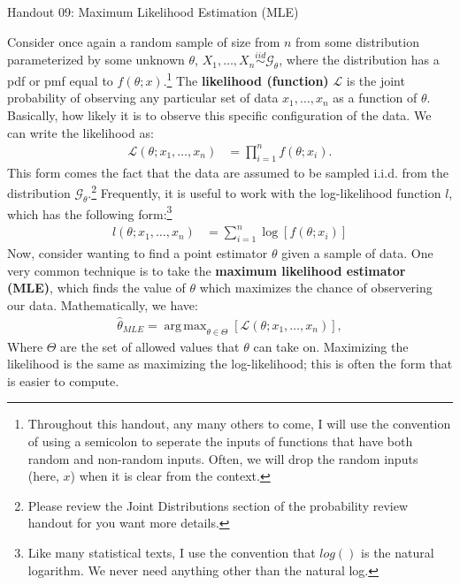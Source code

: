 \documentclass{tufte-handout}
\DeclareMathOperator*{\argmax}{arg\,max}
\newcommand{\iid}{\stackrel{iid}{\sim}}
\begin{document}
\justify

{\LARGE Handout 09: Maximum Likelihood Estimation (MLE)}

\vspace*{18pt}

\noindent
Consider once again a random sample of size from $n$ from some
distribution parameterized by some unknown $\theta$,
$X_1, \ldots, X_n \iid \mathcal{G}_\theta$, where the distribution has a
pdf or pmf equal to $f(\theta; x)$.\footnote{
  Throughout this handout, any many others to come, I will use 
  the convention of using a semicolon to seperate the inputs of
  functions that have both random and non-random inputs. Often,
  we will drop the random inputs (here, $x$) when it is clear from
  the context.
}
The \textbf{likelihood (function)} $\mathcal{L}$ is the joint probability 
of observing any particular set of data $x_1, \ldots, x_n$ as a
function of $\theta$. Basically, how likely it is to observe 
this specific configuration of the data. We can write the likelihood
as:
\begin{align*}
\mathcal{L}(\theta; x_1, \ldots, x_n) &= \prod_{i=1}^n f(\theta; x_i).
\end{align*}
This form comes the fact that the data are assumed to be sampled i.i.d.
from the distribution $\mathcal{G}_\theta$.\footnote{
  Please review the Joint Distributions section of the probability
  review handout for  you want more details.
} Frequently, it is useful to work with the log-likelihood function $l$,
which has the following form:\footnote{
  Like many statistical texts, I use the convention that $log()$ is
  the natural logarithm. We never need anything other than the 
  natural log.
}
\begin{align*}
l(\theta; x_1, \ldots, x_n) &= \sum_{i=1}^n \log\left[ f(\theta; x_i) \right]
\end{align*}
Now, consider wanting to find a point estimator $\theta$ given a 
sample of data. One very common technique is to take the \textbf{maximum
likelihood estimator (MLE)}, which finds the value of $\theta$ which
maximizes the chance of observering our data. Mathematically, we have:
\begin{align*}
\hat{\theta}_{MLE} = \argmax_{\theta \in \Theta} \left[ \mathcal{L}(\theta; x_1, \ldots, x_n) \right],
\end{align*}
Where $\Theta$ are the set of allowed values that $\theta$ can take on.
Maximizing the likelihood is the same as maximizing the log-likelihood;
this is often the form that is easier to compute.
\end{document}

